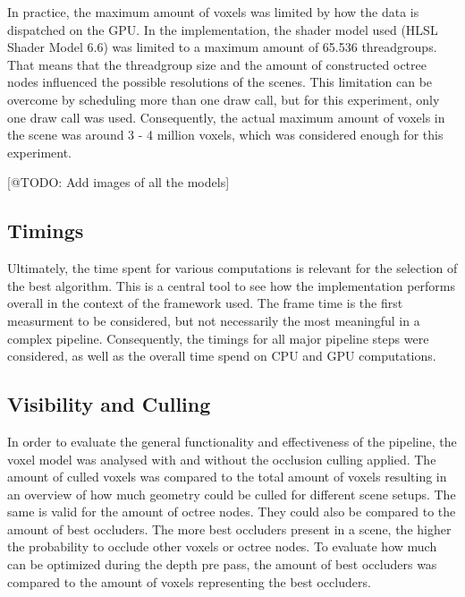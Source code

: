 \noindent
In practice, the maximum amount of voxels was limited by how the data is dispatched on the \ac{GPU}. In the 
implementation, the shader model used (HLSL Shader Model 6.6) was limited to a maximum amount of 65.536 
threadgroups. That means that the threadgroup size and the amount of constructed octree nodes influenced the 
possible resolutions of the scenes. This limitation can be overcome by scheduling more than one draw call, 
but for this experiment, only one draw call was used. Consequently, the actual maximum amount of voxels in the 
scene was around 3 - 4 million voxels, which was considered enough for this experiment.

[@TODO: Add images of all the models]


\subsection*{Timings}

Ultimately, the time spent for various computations is relevant for the selection of the best algorithm. This is 
a central tool to see how the implementation performs overall in the context of the framework used. The frame 
time is the first measurment to be considered, but not necessarily the most meaningful in a complex pipeline. 
Consequently, the timings for all major pipeline steps were considered, as well as the overall time spend on 
\ac{CPU} and \ac{GPU} computations. 




\subsection*{Visibility and Culling}

In order to evaluate the general functionality and effectiveness of the pipeline, the voxel model was analysed 
with and without the occlusion culling applied. The amount of culled voxels was compared to the total amount of 
voxels resulting in an overview of how much geometry could be culled for different scene setups. The same is 
valid for the amount of octree nodes. They could also be compared to the amount of best occluders. The more best 
occluders present in a scene, the higher the probability to occlude other voxels or octree nodes. To evaluate 
how much can be optimized during the depth pre pass, the amount of best occluders was compared to the amount 
of voxels representing the best occluders. \\

